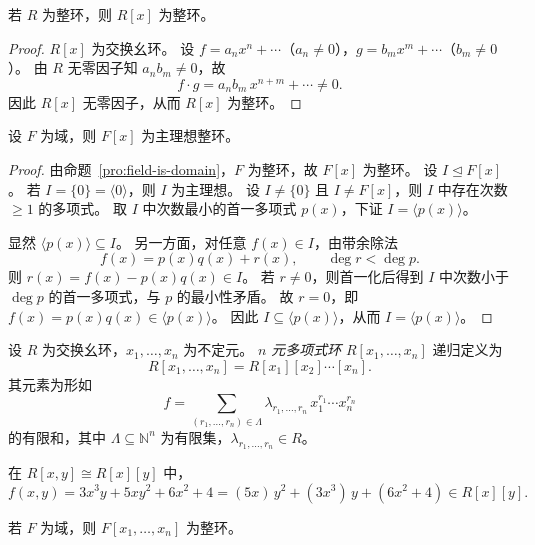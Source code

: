 \documentclass[lang=cn,a4paper,newtx]{elegantbook}
\begin{document}
\begin{proposition}
  若 $R$ 为整环，则 $R[x]$ 为整环。
\end{proposition}

\begin{proof}
  $R[x]$ 为交换幺环。
  设 $f=a_n x^n+\cdots$（$a_n\ne 0$），$g=b_m x^m+\cdots$（$b_m\ne 0$）。
  由 $R$ 无零因子知 $a_n b_m\ne 0$，故
  \[
    f\cdot g = a_n b_m\, x^{n+m}+\cdots \ne 0.
  \]
  因此 $R[x]$ 无零因子，从而 $R[x]$ 为整环。
\end{proof}

\begin{theorem}
  设 $F$ 为域，则 $F[x]$ 为主理想整环。
\end{theorem}

\begin{proof}
  由命题~\ref{pro:field-is-domain}，$F$ 为整环，故 $F[x]$ 为整环。
  设 $I\trianglelefteq F[x]$。
  若 $I=\{0\}=\langle 0\rangle$，则 $I$ 为主理想。
  设 $I\ne\{0\}$ 且 $I\ne F[x]$，则 $I$ 中存在次数 $\ge 1$ 的多项式。
  取 $I$ 中次数最小的首一多项式 $p(x)$，下证 $I=\langle p(x)\rangle$。

  显然 $\langle p(x)\rangle\subseteq I$。
  另一方面，对任意 $f(x)\in I$，由带余除法
  \[
    f(x)=p(x)q(x)+r(x),\qquad \deg r<\deg p.
  \]
  则 $r(x)=f(x)-p(x)q(x)\in I$。
  若 $r\ne 0$，则首一化后得到 $I$ 中次数小于 $\deg p$ 的首一多项式，与 $p$ 的最小性矛盾。
  故 $r=0$，即 $f(x)=p(x)q(x)\in\langle p(x)\rangle$。
  因此 $I\subseteq\langle p(x)\rangle$，从而 $I=\langle p(x)\rangle$。
\end{proof}

\begin{definition}[多元多项式环]
  设 $R$ 为交换幺环，$x_1,\dots,x_n$ 为不定元。
  \emph{$n$ 元多项式环} $R[x_1,\dots,x_n]$ 递归定义为
  \[
    R[x_1,\dots,x_n]=R[x_1][x_2]\cdots[x_n].
  \]
  其元素为形如
  \[
    f=\sum_{(r_1,\dots,r_n)\in\Lambda}\lambda_{r_1,\dots,r_n}\,x_1^{r_1}\cdots x_n^{r_n}
  \]
  的有限和，其中 $\Lambda\subseteq\mathbb{N}^n$ 为有限集，$\lambda_{r_1,\dots,r_n}\in R$。
\end{definition}

\begin{example}
  在 $R[x,y]\cong R[x][y]$ 中，
  \[
    f(x,y)=3x^3y+5xy^2+6x^2+4=(5x)\,y^2+(3x^3)\,y+(6x^2+4)\in R[x][y].
  \]
\end{example}

\begin{corollary}
  若 $F$ 为域，则 $F[x_1,\dots,x_n]$ 为整环。
\end{corollary}
\end{document}

